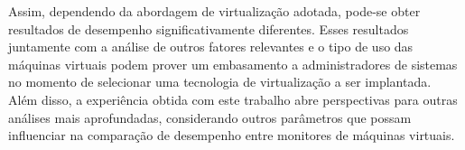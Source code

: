 \documentclass[12pt]{article}
\begin{document}
Assim, dependendo da abordagem de virtualização adotada, pode-se obter resultados de desempenho significativamente diferentes. Esses resultados juntamente com a análise de outros fatores relevantes e o tipo de uso das máquinas virtuais podem prover um embasamento a administradores de sistemas no momento de selecionar uma tecnologia de virtualização a ser implantada. Além disso, a experiência obtida com este trabalho abre perspectivas para outras análises mais aprofundadas, considerando outros parâmetros que possam influenciar na comparação de desempenho entre monitores de máquinas virtuais.



\end{document}
